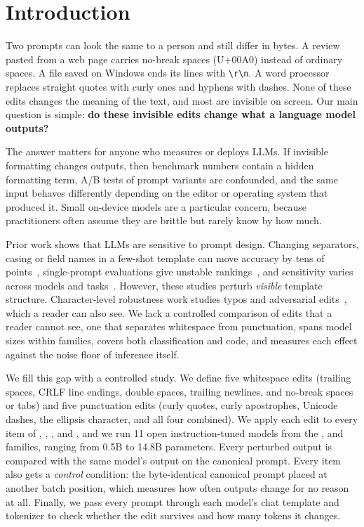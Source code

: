 \section{Introduction}
\label{sec:intro}

Two prompts can look the same to a person and still differ in bytes.
A review pasted from a web page carries no-break spaces (U+00A0) instead of ordinary spaces.
A file saved on Windows ends its lines with \texttt{\textbackslash r\textbackslash n}.
A word processor replaces straight quotes with curly ones and hyphens with dashes.
None of these edits changes the meaning of the text, and most are invisible on screen.
Our main question is simple: {\bf do these invisible edits change what a language model outputs?}

The answer matters for anyone who measures or deploys LLMs.
If invisible formatting changes outputs, then benchmark numbers contain a hidden formatting term, A/B tests of prompt variants are confounded, and the same input behaves differently depending on the editor or operating system that produced it.
Small on-device models are a particular concern, because practitioners often assume they are brittle but rarely know by how much.

Prior work shows that LLMs are sensitive to prompt design.
Changing separators, casing or field names in a few-shot template can move accuracy by tens of points~\cite{sclar2024quantifying}, single-prompt evaluations give unstable rankings~\cite{mizrahi2024state}, and sensitivity varies across models and tasks~\cite{zhuo2024prosa}.
However, these studies perturb \emph{visible} template structure.
Character-level robustness work studies typos and adversarial edits~\cite{belinkov2018synthetic,pruthi2019combating,wang2021textflint}, which a reader can also see.
We lack a controlled comparison of edits that a reader cannot see, one that separates whitespace from punctuation, spans model sizes within families, covers both classification and code, and measures each effect against the noise floor of inference itself.

We fill this gap with a controlled study.
We define five whitespace edits (trailing spaces, CRLF line endings, double spaces, trailing newlines, and no-break spaces or tabs) and five punctuation edits (curly quotes, curly apostrophes, Unicode dashes, the ellipsis character, and all four combined).
We apply each edit to every item of \sst, \agnews, \boolq, \humaneval and \mbpp, and we run 11 open instruction-tuned models from the \qwentwo, \qwenthree and \llama families, ranging from 0.5B to 14.8B parameters.
Every perturbed output is compared with the same model's output on the canonical prompt.
Every item also gets a \emph{control} condition: the byte-identical canonical prompt placed at another batch position, which measures how often outputs change for no reason at all.
Finally, we pass every prompt through each model's chat template and tokenizer to check whether the edit survives and how many tokens it changes.

